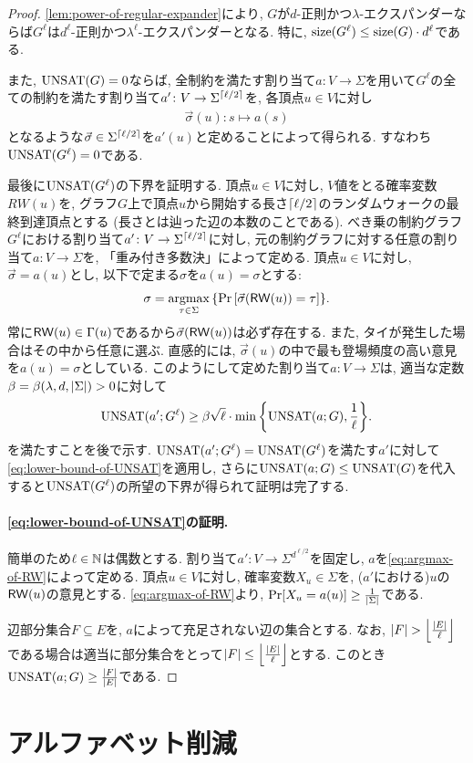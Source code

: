 \begin{proof}

\cref{lem:power-of-regular-expander}により, $G$が$d$-正則かつ$\lambda$-エクスパンダーならば$G^\ell$は$d^\ell$-正則かつ$\lambda^\ell$-エクスパンダーとなる.
特に, $\size(G^\ell) \le \size(G)\cdot d^\ell$である.

また, $\UNSAT(G)=0$ならば, 全制約を満たす割り当て$a\colon V \to \Sigma$を用いて$G^\ell$の全ての制約を満たす割り当て$a'\colon V \to \Sigma^{\ceil{\ell/2}}$を, 各頂点$u\in V$に対し
\begin{align*}
  \vec{\sigma}(u)\colon s \mapsto a(s)
\end{align*}
となるような$\vec{\sigma}\in\Sigma^{\ceil{\ell/2}}$を$a'(u)$と定めることによって得られる.
すなわち$\UNSAT(G^\ell)=0$である.

最後に$\UNSAT(G^\ell)$の下界を証明する.
頂点$u\in V$に対し, $V$値をとる確率変数$RW(u)$を, グラフ$G$上で頂点$u$から開始する長さ$\ceil{\ell/2}$のランダムウォークの最終到達頂点とする (長さとは辿った辺の本数のことである).
べき乗の制約グラフ$G^\ell$における割り当て$a'\colon V \to \Sigma^{\ceil{\ell/2}}$に対し, 元の制約グラフに対する任意の割り当て$a\colon V\to\Sigma$を, 「重み付き多数決」によって定める.
頂点$u\in V$に対し, $\vec{\sigma} = a(u)$とし, 以下で定まる$\sigma$を$a(u)=\sigma$とする:
\begin{align}
  \sigma = \argmax_{\tau \in \Sigma} \qty{ \Pr\qty[ \vec{\sigma}\qty(\RW(u)) = \tau ] }. \label{eq:argmax-of-RW}
\end{align}
常に$\RW(u)\in \Gamma(u)$であるから$\vec{\sigma}\qty( \RW(u) )$は必ず存在する.
また, タイが発生した場合はその中から任意に選ぶ.
直感的には, $\vec{\sigma}(u)$の中で最も登場頻度の高い意見を$a(u)=\sigma$としている.
このようにして定めた割り当て$a\colon V \to \Sigma$は, 適当な定数$\beta=\beta(\lambda,d,\abs{\Sigma})>0$に対して
\begin{align}
  \UNSAT(a';G^\ell) \ge \beta\sqrt{\ell}\cdot \min\qty{ \UNSAT(a;G), \frac{1}{\ell} }. \label{eq:lower-bound-of-UNSAT}
\end{align}
を満たすことを後で示す. $\UNSAT(a';G^\ell)=\UNSAT(G^\ell)$を満たす$a'$に対して\cref{eq:lower-bound-of-UNSAT}を適用し, さらに$\UNSAT(a;G)\le \UNSAT(G)$を代入すると$\UNSAT(G^\ell)$の所望の下界が得られて証明は完了する.

\paragraph*{\cref{eq:lower-bound-of-UNSAT}の証明.}

簡単のため$\ell\in\Nat$は偶数とする.
割り当て$a'\colon V\to \Sigma^{d^{\ell/2}}$を固定し, $a$を\cref{eq:argmax-of-RW}によって定める.
頂点$u\in V$に対し, 確率変数$X_u\in\Sigma$を, ($a'$における)$u$の$\RW(u)$の意見とする.
\cref{eq:argmax-of-RW}より, $\Pr[X_u = a(u)] \ge \frac{1}{\abs{\Sigma}}$である.

辺部分集合$F\subseteq E$を, $a$によって充足されない辺の集合とする.
なお, $\abs{F} > \floor*{\frac{\abs{E}}{\ell}}$である場合は適当に部分集合をとって$\abs{F} \le \floor*{\frac{\abs{E}}{\ell}}$とする.
このとき$\UNSAT(a;G) \ge \frac{\abs{F}}{\abs{E}}$である.



\end{proof}



\section{アルファベット削減}



